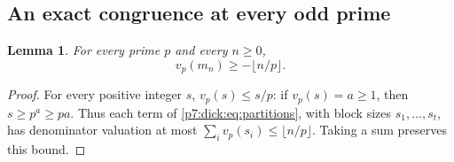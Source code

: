 \documentclass[11pt,a4paper]{article}
\newtheorem{lemma}[theorem]{Lemma}
\theoremstyle{definition}
\theoremstyle{remark}
\numberwithin{equation}{section}
\begin{document}
\subsection{An exact congruence at every odd prime}

\begin{lemma}\label{p7:dick:lem:den-bound}
For every prime $p$ and every $n\ge0$,
\[
 v_p(m_n)\ge-\lfloor n/p\rfloor.
\]
\end{lemma}
\begin{proof}
For every positive integer $s$, $v_p(s)\le s/p$: if $v_p(s)=a\ge1$,
then $s\ge p^a\ge pa$.  Thus each term of
\eqref{p7:dick:eq:partitions}, with block sizes $s_1,\ldots,s_t$, has
denominator valuation at most
$\sum_i v_p(s_i)\le\lfloor n/p\rfloor$.  Taking a sum preserves this bound.
\end{proof}
\end{document}
